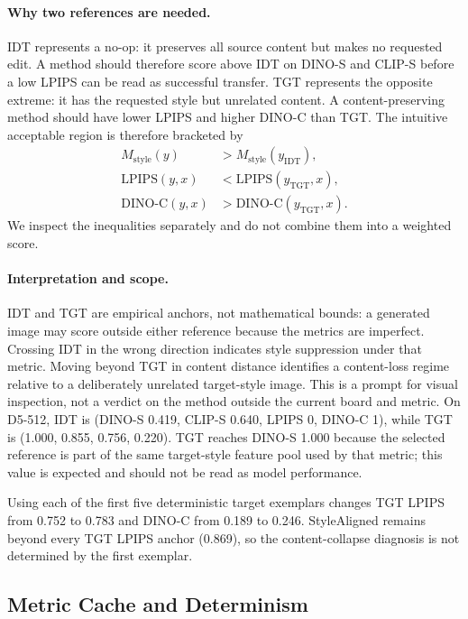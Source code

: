 \documentclass[letterpaper]{article}
\newcommand{\dinos}{DINO-S}
\newcommand{\dinoc}{DINO-C}
\newcommand{\clips}{CLIP-S}
\begin{document}
\paragraph{Why two references are needed.}
IDT represents a no-op: it preserves all source content but makes no requested edit. A
method should therefore score above IDT on \dinos{} and \clips{} before a low LPIPS can be
read as successful transfer. TGT represents the opposite extreme: it has the requested
style but unrelated content. A content-preserving method should have lower LPIPS and higher
\dinoc{} than TGT. The intuitive acceptable region is therefore bracketed by
\begin{equation}
\begin{aligned}
M_{\mathrm{style}}(y)&>M_{\mathrm{style}}(y_{\mathrm{IDT}}),\\
\mathrm{LPIPS}(y,x)&<\mathrm{LPIPS}(y_{\mathrm{TGT}},x),\\
\mathrm{DINO\text{-}C}(y,x)&>\mathrm{DINO\text{-}C}(y_{\mathrm{TGT}},x).
\end{aligned}
\end{equation}
We inspect the inequalities separately and do not combine them into a weighted score.

\paragraph{Interpretation and scope.}
IDT and TGT are empirical anchors, not mathematical bounds: a generated image may score
outside either reference because the metrics are imperfect. Crossing IDT in the wrong
direction indicates style suppression under that metric. Moving beyond TGT in content
distance identifies a content-loss regime relative to a deliberately unrelated target-style
image. This is a prompt for visual inspection, not a verdict on the method outside the
current board and metric. On D5-512, IDT
is (\dinos{} 0.419, \clips{} 0.640, LPIPS 0, \dinoc{} 1), while TGT is
(1.000, 0.855, 0.756, 0.220). TGT reaches \dinos{} 1.000 because the selected reference is
part of the same target-style feature pool used by that metric; this value is expected and
should not be read as model performance.

Using each of the first five deterministic target exemplars changes TGT LPIPS from 0.752
to 0.783 and \dinoc{} from 0.189 to 0.246. StyleAligned remains beyond every TGT LPIPS
anchor (0.869), so the content-collapse diagnosis is not determined by the first exemplar.

\subsection{Metric Cache and Determinism}
\end{document}
